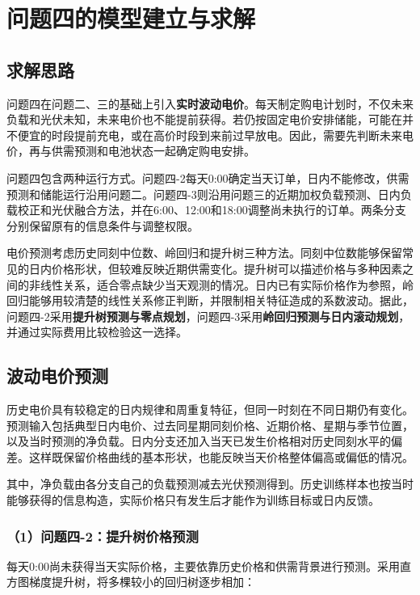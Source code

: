 \section{问题四的模型建立与求解}

\subsection{求解思路}

问题四在问题二、三的基础上引入\textbf{实时波动电价}。每天制定购电计划时，不仅未来负载和光伏未知，未来电价也不能提前获得。若仍按固定电价安排储能，可能在并不便宜的时段提前充电，或在高价时段到来前过早放电。因此，需要先判断未来电价，再与供需预测和电池状态一起确定购电安排。

问题四包含两种运行方式。问题四-2每天0:00确定当天订单，日内不能修改，供需预测和储能运行沿用问题二。问题四-3则沿用问题三的近期加权负载预测、日内负载校正和光伏融合方法，并在6:00、12:00和18:00调整尚未执行的订单。两条分支分别保留原有的信息条件与调整权限。

电价预测考虑历史同刻中位数、岭回归和提升树三种方法。同刻中位数能够保留常见的日内价格形状，但较难反映近期供需变化。提升树可以描述价格与多种因素之间的非线性关系，适合零点缺少当天观测的情况。日内已有实际价格作为参照，岭回归能够用较清楚的线性关系修正判断，并限制相关特征造成的系数波动。据此，问题四-2采用\textbf{提升树预测与零点规划}，问题四-3采用\textbf{岭回归预测与日内滚动规划}，并通过实际费用比较检验这一选择。

\subsection{波动电价预测}

历史电价具有较稳定的日内规律和周重复特征，但同一时刻在不同日期仍有变化。预测输入包括典型日内电价、过去同星期同刻价格、近期价格、星期与季节位置，以及当时预测的净负载。日内分支还加入当天已发生价格相对历史同刻水平的偏差。这样既保留价格曲线的基本形状，也能反映当天价格整体偏高或偏低的情况。

其中，净负载由各分支自己的负载预测减去光伏预测得到。历史训练样本也按当时能够获得的信息构造，实际价格只有发生后才能作为训练目标或日内反馈。

\subsubsection*{（1）问题四-2：提升树价格预测}

每天0:00尚未获得当天实际价格，主要依靠历史价格和供需背景进行预测。采用直方图梯度提升树，将多棵较小的回归树逐步相加：

